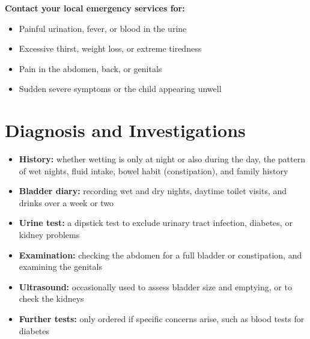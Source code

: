 \textbf{Contact your local emergency services for:}
\begin{itemize}
    \item Painful urination, fever, or blood in the urine
    \item Excessive thirst, weight loss, or extreme tiredness
    \item Pain in the abdomen, back, or genitals
    \item Sudden severe symptoms or the child appearing unwell
\end{itemize}

\section*{Diagnosis and Investigations}
\begin{itemize}
    \item \textbf{History:} whether wetting is only at night or also during the day, the pattern of wet nights, fluid intake, bowel habit (constipation), and family history
    \item \textbf{Bladder diary:} recording wet and dry nights, daytime toilet visits, and drinks over a week or two
    \item \textbf{Urine test:} a dipstick test to exclude urinary tract infection, diabetes, or kidney problems
    \item \textbf{Examination:} checking the abdomen for a full bladder or constipation, and examining the genitals
    \item \textbf{Ultrasound:} occasionally used to assess bladder size and emptying, or to check the kidneys
    \item \textbf{Further tests:} only ordered if specific concerns arise, such as blood tests for diabetes
\end{itemize}

